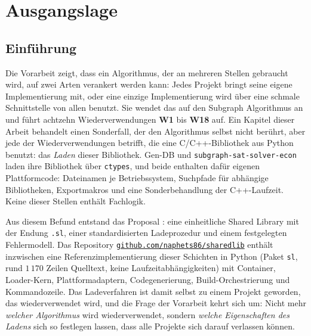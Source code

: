 \documentclass[a4paper,12pt,twoside]{report}
\DeclareRobustCommand{\_}{\ifmmode\mbox{\textunderscore}\else\textunderscore\allowbreak{}\fi}
\theoremstyle{definition}
\newcommand{\repo}[1]{\href{https://github.com/naphets86/#1}{\nolinkurl{github.com/naphets86/#1}}}
\newcommand{\W}[1]{\textbf{W#1}}
\begin{document}
\setcounter{tocdepth}{2}
\tableofcontents
\newpage
{}

\part{Ausgangslage}

\chapter{Einführung}
\label{chap:einleitung}

Die Vorarbeit \cite{epp2026csubgraph} zeigt, dass ein Algorithmus, der an mehreren Stellen gebraucht wird, auf zwei Arten verankert werden kann: Jedes Projekt bringt seine eigene Implementierung mit, oder eine einzige Implementierung wird über eine schmale Schnittstelle von allen benutzt. Sie wendet das auf den Subgraph Algorithmus \cite{epp2026subgraph} an und führt achtzehn Wiederverwendungen \W{1} bis \W{18} auf. Ein Kapitel dieser Arbeit behandelt einen Sonderfall, der den Algorithmus selbst nicht berührt, aber jede der Wiederverwendungen betrifft, die eine C/C++-Bibliothek aus Python benutzt: das \emph{Laden} dieser Bibliothek. Gen-DB und \texttt{subgraph-sat-solver-econ} laden ihre Bibliothek über \texttt{ctypes}, und beide enthalten dafür eigenen Plattformcode: Dateinamen je Betriebssystem, Suchpfade für abhängige Bibliotheken, Exportmakros und eine Sonderbehandlung der C++-Laufzeit. Keine dieser Stellen enthält Fachlogik.

Aus diesem Befund entstand das Proposal \cite{epp2026proposal}: eine einheitliche Shared Library mit der Endung \texttt{.sl}, einer standardisierten Ladeprozedur und einem festgelegten Fehlermodell. Das Repository \repo{sharedlib} enthält inzwischen eine Referenzimplementierung dieser Schichten in Python (Paket \texttt{sl}, rund $1\,170$ Zeilen Quelltext, keine Laufzeitabhängigkeiten) mit Container, Loader-Kern, Plattformadaptern, Codegenerierung, Build-Orchestrierung und Kommandozeile. Das Ladeverfahren ist damit selbst zu einem Projekt geworden, das wiederverwendet wird, und die Frage der Vorarbeit kehrt sich um: Nicht mehr \emph{welcher Algorithmus} wird wiederverwendet, sondern \emph{welche Eigenschaften des Ladens} sich so festlegen lassen, dass alle Projekte sich darauf verlassen können.
\end{document}
